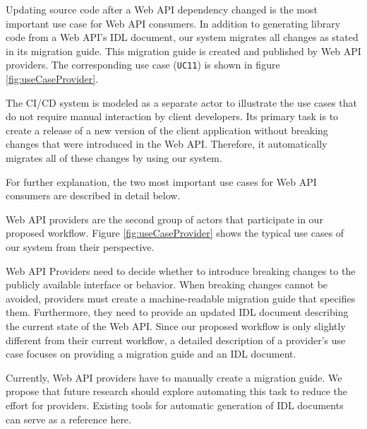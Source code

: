 Updating source code after a Web API dependency changed is the most important use case for Web API consumers. In addition to generating library code from a Web API's IDL document, our system migrates all changes as stated in its migration guide. This migration guide is created and published by Web API providers. The corresponding use case (\texttt{UC11}) is shown in figure \ref{fig:useCaseProvider}. 

The CI/CD system is modeled as a separate actor to illustrate the use cases that do not require manual interaction by client developers. Its primary task is to create a release of a new version of the client application without breaking changes that were introduced in the Web API. Therefore, it automatically migrates all of these changes by using our system.

For further explanation, the two most important use cases for Web API consumers are described in detail below.




Web API providers are the second group of actors that participate in our proposed workflow. Figure \ref{fig:useCaseProvider} shows the typical use cases of our system from their perspective.

\begin{figure}[h]
\end{figure}

Web API Providers need to decide whether to introduce breaking changes to the publicly available interface or behavior. When breaking changes cannot be avoided, providers must create a machine-readable migration guide that specifies them. Furthermore, they need to provide an updated IDL document describing the current state of the Web API. Since our proposed workflow is only slightly different from their current workflow, a detailed description of a provider's use case focuses on providing a migration guide and an IDL document.



Currently, Web API providers have to manually create a migration guide. We propose that future research should explore automating this task to reduce the effort for providers. Existing tools for automatic generation of IDL documents can serve as a reference here.